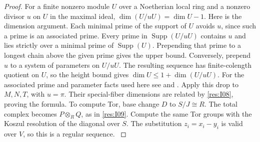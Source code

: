 \documentclass[11pt,oneside,openany]{book}
\theoremstyle{definition}
\theoremstyle{remark}
\begin{document}
\begin{proof}
For a finite nonzero module \(U\) over a Noetherian local ring
and a nonzero divisor \(u\) on \(U\) in the maximal ideal,
\(\dim(U/uU)=\dim U-1\). Here is the dimension argument.
Each minimal prime of the support of \(U\) avoids \(u\),
since such a prime is an associated prime. Every prime
in \(\operatorname{Supp}(U/uU)\) contains \(u\) and lies
strictly over a minimal prime of \(\operatorname{Supp}(U)\).
Prepending that prime to a longest chain above the given prime
gives the upper bound. Conversely, prepend \(u\) to a system of
parameters on \(U/uU\). The resulting sequence has finite-colength
quotient on \(U\), so the height bound gives
\(\dim U\le 1+\dim(U/uU)\). For the associated prime and parameter
facts used here see \cite[Chapter 6]{core} and
\cite[ALG-05-C03-S01]{p103}.
Apply this drop to \(M,N,T\), with \(u=\pi\). Their special-fiber
dimensions are related by \ref{res:I08}, proving the formula.
To compute Tor, base change \(D\) to \(S/J\cong R\). The total
complex becomes \(P\otimes_R Q\), as in \ref{res:I09}. Compute
the same Tor groups with the Koszul resolution of the diagonal
over \(S\). The substitution \(z_i=x_i-y_i\) is valid over \(V\),
so this is a regular sequence. \cite[Chapter V, \S B.5, Lemma 1]{serre-local}
\end{proof}
\end{document}
